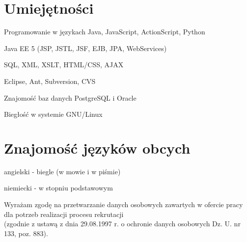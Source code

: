 \documentclass[letterpaper]{article}
\renewenvironment{itemize}{
  \begin{list}{}{
    \setlength{\leftmargin}{1.5em}
  }
}{
  \end{list}
}
\begin{document}
\section*{Umiejętności}

\begin{itemize}
\item Programowanie w językach Java, JavaScript, ActionScript, Python
\item Java EE 5 (JSP, JSTL, JSF, EJB, JPA, WebServices)
\item SQL, XML, XSLT, HTML/CSS, AJAX
\item Eclipse, Ant, Subversion, CVS
\item Znajomość baz danych PostgreSQL i Oracle
\item Biegłość w systemie GNU/Linux
\end{itemize}


\section*{Znajomość języków obcych}

\begin{itemize}
\item angielski - biegle (w mowie i w piśmie)
\item niemiecki - w stopniu podstawowym
\end{itemize}


\bigskip

\begin{center}
  \begin{footnotesize}
    Wyrażam zgodę na przetwarzanie danych osobowych zawartych w ofercie pracy dla potrzeb realizacji procesu rekrutacji\\
    (zgodnie z ustawą z dnia 29.08.1997 r. o ochronie danych osobowych Dz. U. nr 133, poz. 883).
  \end{footnotesize}
\end{center}
\end{document}
